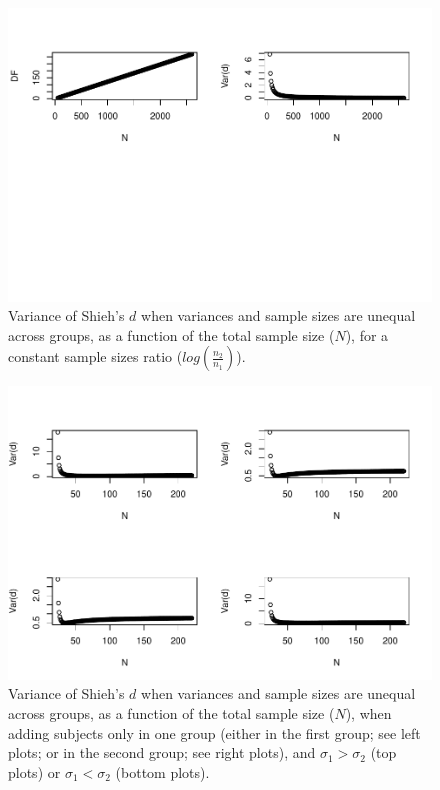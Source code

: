 \documentclass[
  english,
  man,mask]{apa6}
\begin{document}
\begin{figure}
\centering
\includegraphics{Theoretical-Variance-of-all-estimators-as-a-function-of-population-parameters_files/figure-latex/varshiehhetunbalNsize2-1.pdf}
\caption{\label{fig:varshiehhetunbalNsize2}Variance of Shieh's \(d\) when variances and sample sizes are unequal across groups, as a function of the total sample size (\(N\)), for a constant sample sizes ratio (\(log\left(\frac{n_2}{n_1} \right)\)).}
\end{figure}

\begin{figure}
\centering
\includegraphics{Theoretical-Variance-of-all-estimators-as-a-function-of-population-parameters_files/figure-latex/varshiehhetunbalNsize4-1.pdf}
\caption{\label{fig:varshiehhetunbalNsize4}Variance of Shieh's \(d\) when variances and sample sizes are unequal across groups, as a function of the total sample size (\(N\)), when adding subjects only in one group (either in the first group; see left plots; or in the second group; see right plots), and \(\sigma_1 > \sigma_2\) (top plots) or \(\sigma_1 < \sigma_2\) (bottom plots).}
\end{figure}
\end{document}

